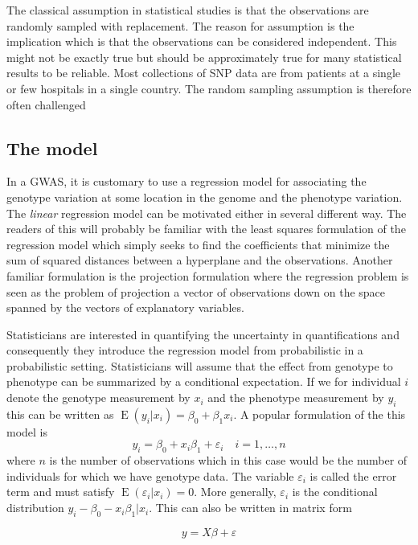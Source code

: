 \documentclass[final,leqno]{siamltex1213}
\DeclareMathOperator{\E}{E}
\begin{document}
The classical assumption in statistical studies is that the observations are randomly sampled with replacement. The reason for assumption is the implication which is that the observations can be considered independent. This might not be exactly true but should be approximately true for many statistical results to be reliable. Most collections of SNP data are from patients at a single or few hospitals in a single country. The random sampling assumption is therefore often challenged

\subsection{The model}
In a GWAS, it is customary to use a regression model for associating the genotype variation at some location in the genome and the phenotype variation. The \emph{linear} regression model can be motivated either in several different way. The readers of this will probably be familiar with the least squares formulation of the regression model which simply seeks to find the coefficients that minimize the sum of squared distances between a hyperplane and the observations. Another familiar formulation is the projection formulation where the regression problem is seen as the problem of projection a vector of observations down on the space spanned by the vectors of explanatory variables.

Statisticians are interested in quantifying the uncertainty in quantifications and consequently they introduce the regression model from probabilistic in a probabilistic setting. Statisticians will assume that the effect from genotype to phenotype can be summarized by a conditional expectation. If we for individual $i$ denote the genotype measurement by $x_i$ and the phenotype measurement by $y_i$ this can be written as $\E(y_i|x_i)=\beta_0 + \beta_1 x_i$. A popular formulation of the this model is
\begin{equation*}
    y_i = \beta_0 + x_i \beta_1 + \varepsilon_i\quad i=1,\dots,n
\end{equation*}
where $n$ is the number of observations which in this case would be the number of individuals for which we have genotype data. The variable $\varepsilon_i$ is called the error term and must satisfy $\E(\varepsilon_i|x_i)=0$. More generally, $\varepsilon_i$ is the conditional distribution $y_i - \beta_0 - x_i\beta_1|x_i$. This can also be written in matrix form

\begin{equation}
\label{eq:linreg}
    y = X\beta + \varepsilon
\end{equation}
\end{document}
